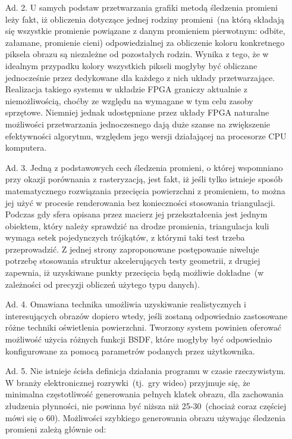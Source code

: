 \begin{enumerate}
\item[Ad. 2.] U samych podstaw przetwarzania grafiki metodą śledzenia promieni leży fakt, iż obliczenia dotyczące jednej rodziny promieni~(na którą składają się wszystkie promienie powiązane z danym promieniem pierwotnym: odbite, załamane, promienie cieni) odpowiedzialnej za obliczenie koloru konkretnego piksela obrazu są niezależne od pozostałych rodzin. Wynika z tego, że w idealnym przypadku kolory wszystkich pikseli mogłyby być obliczane jednocześnie przez dedykowane dla każdego z nich układy przetwarzające. Realizacja takiego systemu w układzie FPGA graniczy aktualnie z niemożliwością, choćby ze względu na wymagane w tym celu zasoby sprzętowe. Niemniej jednak udostępniane przez układy FPGA naturalne możliwości przetwarzania jednoczesnego dają duże szanse na zwiększenie efektywności algorytmu, względem jego wersji działającej na procesorze CPU komputera.
\item[Ad. 3.] Jedną z podstawowych cech śledzenia promieni, o której wspomniano przy okazji porównania z rasteryzacją, jest fakt, iż jeśli tylko istnieje sposób matematycznego rozwiązania przecięcia powierzchni z promieniem, to można jej użyć w procesie renderowania bez konieczności stosowania triangulacji. Podczas gdy sfera opisana przez macierz jej przekształcenia jest jednym obiektem, który należy sprawdzić na drodze promienia, triangulacja kuli wymaga setek pojedynczych trójkątów, z którymi taki test trzeba przeprowadzić. Z jednej strony zaproponowane postępowanie niweluje potrzebę stosowania struktur akcelerujących testy geometrii, z drugiej zapewnia, iż uzyskiwane punkty przecięcia będą możliwie dokładne~(w zależności od precyzji obliczeń użytego typu danych).
\item[Ad. 4.] Omawiana technika umożliwia uzyskiwanie realistycznych i interesujących obrazów dopiero wtedy, jeśli zostaną odpowiednio zastosowane różne techniki oświetlenia powierzchni. Tworzony system powinien oferować możliwość użycia różnych funkcji BSDF, które mogłyby być odpowiednio konfigurowane za pomocą parametrów podanych przez użytkownika.
\item[Ad. 5.] Nie istnieje ścisła definicja działania programu w czasie rzeczywistym. W branży elektronicznej rozrywki~(tj.~gry wideo) przyjmuje się, że minimalna częstotliwość generowania pełnych klatek obrazu, dla zachowania złudzenia płynności, nie powinna być niższa niż 25-30~(chociaż coraz częściej mówi się o 60). Możliwości szybkiego generowania obrazu używając śledzenia promieni zależą głównie od:
\begin{itemize}

\end{itemize}
\end{enumerate}
